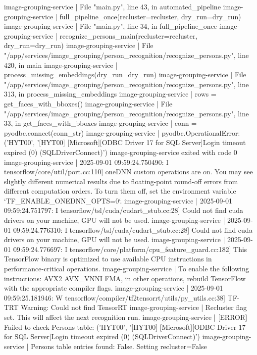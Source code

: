 image-grouping-service  |   File "main.py", line 43, in automated_pipeline
image-grouping-service  |     full_pipeline_once(recluster=recluster, dry_run=dry_run)
image-grouping-service  |   File "main.py", line 34, in full_pipeline_once
image-grouping-service  |     recognize_persons_main(recluster=recluster, dry_run=dry_run)
image-grouping-service  |   File "/app/services/image_grouping/person_recognition/recognize_persons.py", line 420, in main
image-grouping-service  |     process_missing_embeddings(dry_run=dry_run)
image-grouping-service  |   File "/app/services/image_grouping/person_recognition/recognize_persons.py", line 313, in process_missing_embeddings
image-grouping-service  |     rows = get_faces_with_bboxes()
image-grouping-service  |   File "/app/services/image_grouping/person_recognition/recognize_persons.py", line 33, in get_faces_with_bboxes
image-grouping-service  |     conn = pyodbc.connect(conn_str)
image-grouping-service  | pyodbc.OperationalError: ('HYT00', '[HYT00] [Microsoft][ODBC Driver 17 for SQL Server]Login timeout expired (0) (SQLDriverConnect)')
image-grouping-service exited with code 0
image-grouping-service  | 2025-09-01 09:59:24.750490: I tensorflow/core/util/port.cc:110] oneDNN custom operations are on. You may see slightly different numerical results due to floating-point round-off errors from different computation orders. To turn them off, set the environment variable `TF_ENABLE_ONEDNN_OPTS=0`.
image-grouping-service  | 2025-09-01 09:59:24.751797: I tensorflow/tsl/cuda/cudart_stub.cc:28] Could not find cuda drivers on your machine, GPU will not be used.
image-grouping-service  | 2025-09-01 09:59:24.776310: I tensorflow/tsl/cuda/cudart_stub.cc:28] Could not find cuda drivers on your machine, GPU will not be used.
image-grouping-service  | 2025-09-01 09:59:24.776697: I tensorflow/core/platform/cpu_feature_guard.cc:182] This TensorFlow binary is optimized to use available CPU instructions in performance-critical operations.
image-grouping-service  | To enable the following instructions: AVX2 AVX_VNNI FMA, in other operations, rebuild TensorFlow with the appropriate compiler flags.
image-grouping-service  | 2025-09-01 09:59:25.181946: W tensorflow/compiler/tf2tensorrt/utils/py_utils.cc:38] TF-TRT Warning: Could not find TensorRT
image-grouping-service  | Recluster flag set. This will affect the next recognition run.
image-grouping-service  | [ERROR] Failed to check Persons table: ('HYT00', '[HYT00] [Microsoft][ODBC Driver 17 for SQL Server]Login timeout expired (0) (SQLDriverConnect)')
image-grouping-service  | Persons table entries found: False. Setting recluster=False
